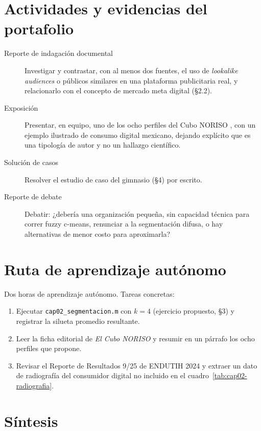 \section{Actividades y evidencias del portafolio}

\begin{description}
  \item[Reporte de indagación documental] Investigar y contrastar, con al
  menos dos fuentes, el uso de \textit{lookalike audiences} o públicos
  similares en una plataforma publicitaria real, y relacionarlo con el
  concepto de mercado meta digital (§2.2).
  \item[Exposición] Presentar, en equipo, uno de los ocho perfiles del Cubo
  NORISO \parencite{delgado2015noriso}, con un ejemplo ilustrado de consumo
  digital mexicano, dejando explícito que es una tipología de autor y no un
  hallazgo científico.
  \item[Solución de casos] Resolver el estudio de caso del gimnasio (§4) por
  escrito.
  \item[Reporte de debate] Debatir: ¿debería una organización pequeña, sin
  capacidad técnica para correr fuzzy c-means, renunciar a la segmentación
  difusa, o hay alternativas de menor costo para aproximarla?
\end{description}

\section{Ruta de aprendizaje autónomo}

Dos horas de aprendizaje autónomo. Tareas concretas:
\begin{enumerate}
  \item Ejecutar \texttt{cap02\_segmentacion.m} con $k=4$ (ejercicio
  propuesto, §3) y registrar la silueta promedio resultante.
  \item Leer la ficha editorial de \textit{El Cubo NORISO}
  \parencite{delgado2015noriso} y resumir en un párrafo los ocho perfiles que
  propone.
  \item Revisar el Reporte de Resultados 9/25 de ENDUTIH 2024 y extraer un
  dato de radiografía del consumidor digital no incluido en el
  cuadro~\ref{tab:cap02-radiografia}.
\end{enumerate}

\section{Síntesis}

